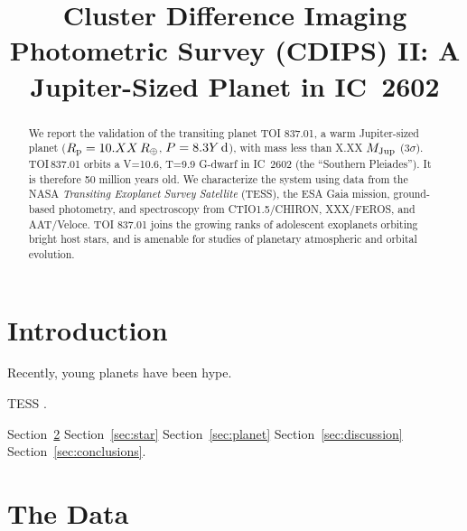 \documentclass[12pt,twocolumn,tighten]{aastex62}
\begin{document}

\title{Cluster Difference Imaging Photometric Survey (CDIPS) II: A Jupiter-Sized Planet in IC~2602}



\begin{abstract}
We report the validation of the transiting planet TOI 837.01,
a warm Jupiter-sized planet ($R_{\rm p} = 10.XX\,R_\oplus$, $P =
8.3Y\,{\rm d}$), with mass less than X.XX $M_{\rm Jup}$ (3$\sigma$).
TOI$\,$837.01 orbits a V=10.6, T=9.9 G-dwarf in IC~2602 (the
``Southern Pleiades''). It is therefore 50 million years old.
We characterize the system using data from the NASA {\it Transiting
Exoplanet Survey Satellite} (TESS), the ESA Gaia mission,
ground-based photometry, and spectroscopy from CTIO1.5/CHIRON,
XXX/FEROS, and AAT/Veloce.
TOI 837.01 joins the growing ranks of adolescent exoplanets orbiting
bright host stars, and is amenable for studies of planetary
atmospheric and orbital evolution.
\end{abstract}




\section{Introduction}

Recently, young planets have been hype.

TESS \citep{ricker_transiting_2015}.

Section~\ref{sec:observations} 
Section~\ref{sec:star}
Section~\ref{sec:planet}
Section~\ref{sec:discussion}
Section~\ref{sec:conclusions}.



\section{The Data}
\label{sec:observations}
\end{document}
